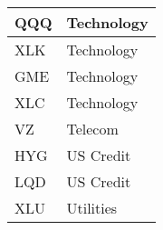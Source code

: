 \begin{table}[H]
\begin{tabular}{ll}
        QQQ & Technology \\
        \hline
        XLK & Technology \\
        \hline
        GME & Technology \\
        \hline
        XLC & Technology \\
        \hline
        VZ & Telecom \\
        \hline
        HYG & US Credit \\
        \hline
        LQD & US Credit \\
        \hline
        XLU & Utilities \\
        \bottomrule
        \end{tabular}      
    \label{table:tickers}
\end{table}
